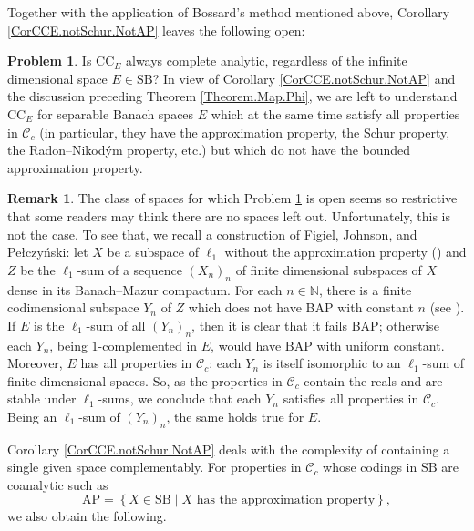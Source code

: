\documentclass[letterpaper]{amsart}
\numberwithin{equation}{section}
\theoremstyle{definition}
\newtheorem{remark}[theorem]{Remark}
\newtheorem{problem}[theorem]{Problem}
\newcommand{\N}{{\mathbb{N}}}
\newcommand{\SB}{\mathrm{SB}}
\newcommand{\AP}{\mathrm{AP}}
\begin{document}
Together with the application of Bossard's method mentioned above, Corollary \ref{CorCCE.notSchur.NotAP} leaves the following open:

\begin{problem}\label{problem.left.open}
Is $\mathrm{CC}_E$ always complete analytic, regardless of the infinite dimensional space $E\in \SB$? In view of Corollary \ref{CorCCE.notSchur.NotAP} and the discussion preceding Theorem \ref{Theorem.Map.Phi}, we are left to understand $\mathrm{CC}_E$ for separable Banach spaces $E$ which at the same time satisfy all properties in $\mathcal C_c$ (in particular, they have the approximation property, the Schur property, the Radon--Nikodým property, etc.) but which do not have the bounded approximation property.  
\end{problem}

\begin{remark} \label{Remark}
The class of spaces for which Problem \ref{problem.left.open} is open seems so restrictive that some readers may think there are no spaces left out. Unfortunately, this is not the case. To see that, we recall a construction of Figiel, Johnson, and Pe{\l}czy\'nski: let $X$ be a subspace of $\ell_1$ without the approximation property (\cite{Szankowski1978Israel}) and $Z$ be the $\ell_1$-sum of a sequence  $(X_n)_n$   of finite dimensional subspaces of $X$ dense in its Banach–Mazur compactum. For each $n\in\N$, there is a finite codimensional subspace $Y_n$ of $Z$ which does not have   BAP with constant $n$  (see \cite[Corollaries 1.11 and 1.13]{FigielJohnsonPelczynski2011Israel}). If $E$ is the $\ell_1$-sum of all $(Y_n)_n$, then it is clear that it fails BAP; otherwise each $Y_n$, being $1$-complemented in $E$, would have BAP with uniform constant. Moreover,  $E$ has all properties in $\mathcal C_c$:  each $Y_n$ is itself isomorphic to an $\ell_1$-sum of finite dimensional spaces. So, as the properties in $\mathcal C_c$ contain the reals and are  stable under $\ell_1$-sums, we conclude that each $Y_n$ satisfies all properties in $\mathcal C_c$. Being an $\ell_1$-sum of $(Y_n)_n$, the same holds true for  $E$.
\end{remark}

Corollary \ref{CorCCE.notSchur.NotAP} deals with the complexity of containing a single given space complementably. For properties in $\mathcal C_c$ whose codings in $\SB$ are coanalytic such as 
\[\AP=\left\{X\in\SB \mid X \text{ has the approximation property}\right\},\]
 we also obtain the following.
\end{document}
